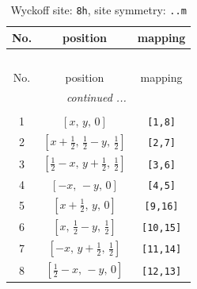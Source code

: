 \documentclass[fleqn,8pt]{jsarticle}
\begin{document}
\begin{longtable}{ccc}
\caption{Wyckoff site: {\tt 8h}, site symmetry: {\tt ..m}}
 \\
 \hline \hline
No. & position & mapping \\ \hline \endfirsthead

\multicolumn{2}{l}{\tablename\ \thetable{}} \\
 \hline \hline
No. & position & mapping \\ \hline \endhead

 \hline \hline
\multicolumn{2}{r}{\footnotesize\it continued ...} \\ \endfoot

 \hline \hline
\multicolumn{2}{r}{} \\ \endlastfoot

1 & $\left[ x,\, y,\, 0 \right]$ & {\tt [1,8]} \\ \hline
2 & $\left[ x + \frac{1}{2},\, \frac{1}{2} - y,\, \frac{1}{2} \right]$ & {\tt [2,7]} \\ \hline
3 & $\left[ \frac{1}{2} - x,\, y + \frac{1}{2},\, \frac{1}{2} \right]$ & {\tt [3,6]} \\ \hline
4 & $\left[ - x,\, - y,\, 0 \right]$ & {\tt [4,5]} \\ \hline
5 & $\left[ x + \frac{1}{2},\, y,\, 0 \right]$ & {\tt [9,16]} \\ \hline
6 & $\left[ x,\, \frac{1}{2} - y,\, \frac{1}{2} \right]$ & {\tt [10,15]} \\ \hline
7 & $\left[ - x,\, y + \frac{1}{2},\, \frac{1}{2} \right]$ & {\tt [11,14]} \\ \hline
8 & $\left[ \frac{1}{2} - x,\, - y,\, 0 \right]$ & {\tt [12,13]} \\
\end{longtable}
\renewcommand{\arraystretch}{1.2}
\end{document}

